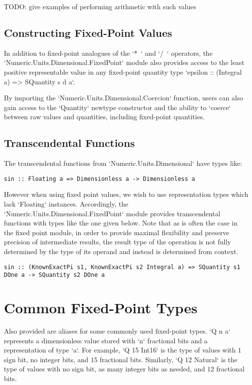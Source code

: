 \documentclass[11pt]{report}
\begin{document}
TODO: give examples of performing arithmetic with such values

\subsection{Constructing Fixed-Point Values}

In addition to fixed-point analogues of the `*~` and `/~` operators, the `Numeric.Units.Dimensional.FixedPoint`
module also provides access to the least positive representable value in any fixed-point quantity type `epsilon :: (Integral a) => SQuantity s d a`.

By importing the `Numeric.Units.Dimensional.Coercion` function, users can also gain access to the `Quantity` newtype constructor
and the ability to `coerce` between raw values and quantities, including fixed-point quantities.

\subsection{Transcendental Functions}

The transcendental functions from `Numeric.Units.Dimensional` have types like:

\begin{lstlisting}
sin :: Floating a => Dimensionless a -> Dimensionless a
\end{lstlisting}

However when using fixed point values, we wish to use representation types which lack `Floating` instances. Accordingly,
the `Numeric.Units.Dimensional.FixedPoint` module provides transcendental functions with types like the one given below.
Note that as is often the case in the fixed point module, in order to provide maximal flexibility and preserve precision of
intermediate results, the result type of the operation is not fully determined by the type of its operand and instead is
determined from context.

\begin{lstlisting}
sin :: (KnownExactPi s1, KnownExactPi s2 Integral a) => SQuantity s1 DOne a -> SQuantity s2 DOne a
\end{lstlisting}

\section{Common Fixed-Point Types}

Also provided are aliases for some commonly used fixed-point types. `Q n a` represents a dimensionless value stored with `n` fractional bits
and a representation of type `a`. For example, `Q 15 Int16` is the type of values with $ 1 $ sign bit, no integer bits, and $ 15 $ fractional bits.
Similarly, `Q 12 Natural` is the type of values with no sign bit, as many integer bits as needed, and $ 12 $ fractional bits.
\end{document}

